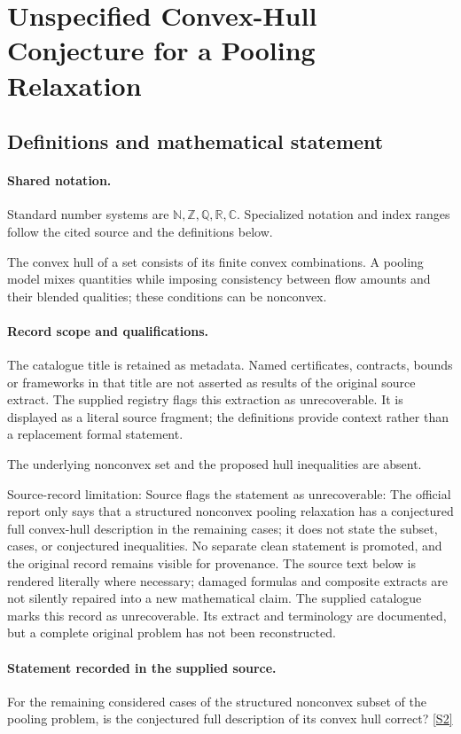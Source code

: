 \documentclass[11pt]{article}
\newcommand{\sref}[2]{\hyperlink{source:#1:#2}{[S#2]}}
\begin{document}
\section{Unspecified Convex-Hull Conjecture for a Pooling Relaxation}\label{statement}

\subsection{Definitions and mathematical statement}

\paragraph{Shared notation.}Standard number systems are $\mathbb N,\mathbb Z,\mathbb Q,\mathbb R,\mathbb C$. Specialized notation and index ranges follow the cited source and the definitions below.


The convex hull of a set consists of its finite convex combinations. A pooling model mixes quantities while imposing consistency between flow amounts and their blended qualities; these conditions can be nonconvex.
\paragraph{Record scope and qualifications.}
The catalogue title is retained as metadata. Named certificates, contracts, bounds or frameworks in that title are not asserted as results of the original source extract.
The supplied registry flags this extraction as unrecoverable. It is displayed as a literal source fragment; the definitions provide context rather than a replacement formal statement.

The underlying nonconvex set and the proposed hull inequalities are absent.

Source-record limitation: Source flags the statement as unrecoverable: The official report only says that a structured nonconvex pooling relaxation has a conjectured full convex-hull description in the remaining cases; it does not state the subset, cases, or conjectured inequalities. No separate clean statement is promoted, and the original record remains visible for provenance.
The source text below is rendered literally where necessary; damaged formulas and composite extracts are not silently repaired into a new mathematical claim.
The supplied catalogue marks this record as unrecoverable. Its extract and terminology are documented, but a complete original problem has not been reconstructed.
\paragraph{Statement recorded in the supplied source.}
For the remaining considered cases of the structured nonconvex subset of the pooling problem, is the conjectured full description of its convex hull correct? \sref{statement}{2}
\end{document}
